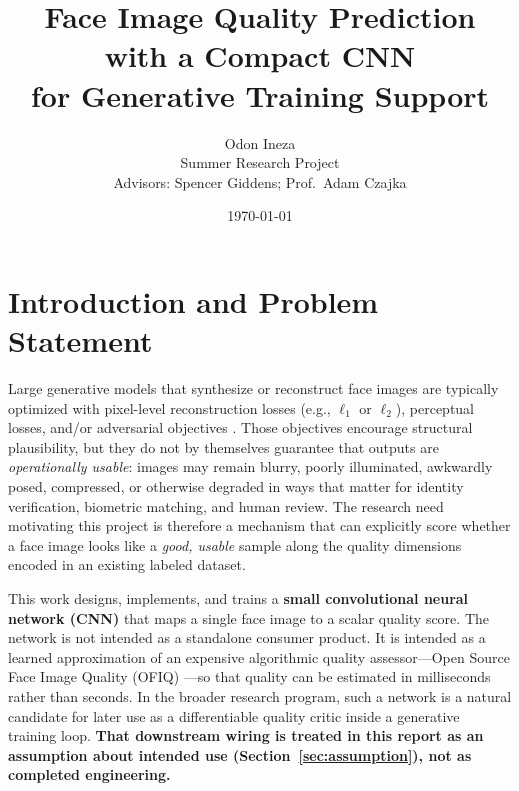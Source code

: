 \documentclass[12pt, letterpaper, titlepage]{article}
\begin{document}

\title{Face Image Quality Prediction with a Compact CNN\\for Generative Training Support}
\author{Odon Ineza \\ Summer Research Project \\ Advisors: Spencer Giddens; Prof.\ Adam Czajka}
\date{\today}
\maketitle
{}

\tableofcontents
\clearpage
\listoffigures
\clearpage
\listoftables
\clearpage
{}
\setcounter{page}{1}


\section{Introduction and Problem Statement}
\label{sec:intro}

Large generative models that synthesize or reconstruct face images are typically optimized with pixel-level reconstruction losses (e.g., $\ell_1$ or $\ell_2$), perceptual losses, and/or adversarial objectives \citep{goodfellow2014gan}. Those objectives encourage structural plausibility, but they do not by themselves guarantee that outputs are \emph{operationally usable}: images may remain blurry, poorly illuminated, awkwardly posed, compressed, or otherwise degraded in ways that matter for identity verification, biometric matching, and human review. The research need motivating this project is therefore a mechanism that can explicitly score whether a face image looks like a \emph{good, usable} sample along the quality dimensions encoded in an existing labeled dataset.

This work designs, implements, and trains a \textbf{small convolutional neural network (CNN)} that maps a single face image to a scalar quality score. The network is not intended as a standalone consumer product. It is intended as a learned approximation of an expensive algorithmic quality assessor---Open Source Face Image Quality (OFIQ) \citep{bsi2024ofiq,iso29794_5_2025}---so that quality can be estimated in milliseconds rather than seconds. In the broader research program, such a network is a natural candidate for later use as a differentiable quality critic inside a generative training loop. \textbf{That downstream wiring is treated in this report as an assumption about intended use (Section~\ref{sec:assumption}), not as completed engineering.}
\end{document}
